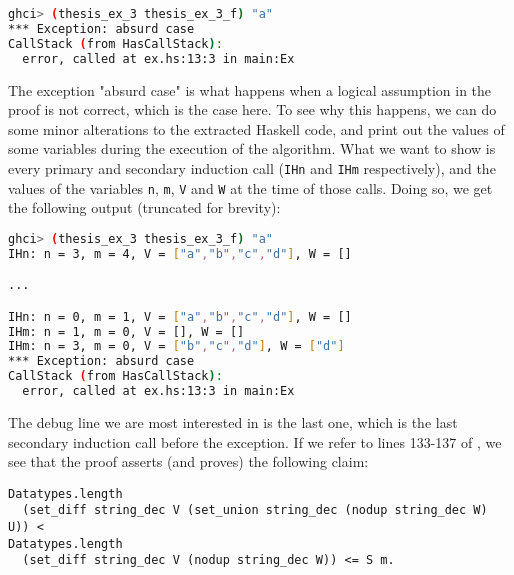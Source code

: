 \begin{minipage}{\linewidth}
\begin{lstlisting}[language=bash, label={lst:thm_32_haskell_output_extended}, caption={Output of \lstinline{thm_32} example extended}]
ghci> (thesis_ex_3 thesis_ex_3_f) "a"
*** Exception: absurd case
CallStack (from HasCallStack):
  error, called at ex.hs:13:3 in main:Ex
\end{lstlisting}
\end{minipage}

The exception "absurd case" is what happens when a logical assumption in the proof
is not correct, which is the case here.
To see why this happens, we can do some minor alterations to the extracted Haskell code,
and print out the values of some variables during the execution of the algorithm.
What we want to show is every primary and secondary induction call (\lstinline{IHn} and \lstinline{IHm} respectively),
and the values of the variables \lstinline{n}, \lstinline{m}, \lstinline{V} and \lstinline{W} at the time of those calls.
Doing so, we get the following output (truncated for brevity):

\begin{minipage}{\linewidth}
\begin{lstlisting}[language=bash, label={lst:thm_32_haskell_output_extended_debug}, caption={Output of \lstinline{thm_32} example extended, with debug}]
ghci> (thesis_ex_3 thesis_ex_3_f) "a"
IHn: n = 3, m = 4, V = ["a","b","c","d"], W = []

...

IHn: n = 0, m = 1, V = ["a","b","c","d"], W = []
IHm: n = 1, m = 0, V = [], W = []
IHm: n = 3, m = 0, V = ["b","c","d"], W = ["d"]
*** Exception: absurd case
CallStack (from HasCallStack):
  error, called at ex.hs:13:3 in main:Ex
\end{lstlisting}
\end{minipage}

The debug line we are most interested in is the last one,
which is the last secondary induction call before the exception.
If we refer to lines 133-137 of ,
we see that the proof asserts (and proves) the following claim:

\begin{minipage}{\linewidth}
\begin{lstlisting}[language=Coq, label={lst:thm_32_false_claim}, caption={False claim in \lstinline{thm_32} proof}]
Datatypes.length
  (set_diff string_dec V (set_union string_dec (nodup string_dec W) U)) <
Datatypes.length
  (set_diff string_dec V (nodup string_dec W)) <= S m.
\end{lstlisting}
\end{minipage}

